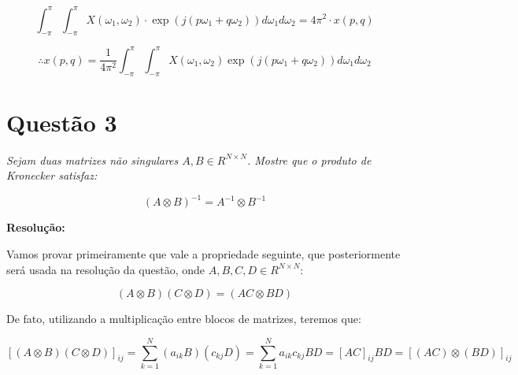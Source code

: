 \documentclass[]{abntex2}
\begin{document}
\begin{equation*}
	\int_{-\pi}^{\pi} \int_{-\pi}^{\pi}X(\omega_1, \omega_2) \cdot \exp \left( j (p \omega_1 + q \omega_2) \right)d\omega_1 d\omega_2 = 4\pi^{2}\cdot x(p,q)
\end{equation*}

\begin{tcolorbox}
	\[
		\therefore x(p, q) = \frac{1}{4\pi^2} \int_{-\pi}^{\pi} \int_{-\pi}^{\pi} X(\omega_1, \omega_2) \exp \left( j (p \omega_1 + q \omega_2) \right) d\omega_1 d\omega_2
	\]
	\end{tcolorbox}


\section*{\textbf{Questão 3}}

\textit{Sejam duas matrizes não singulares $A,B \in R^{N \times N}$. Mostre que o produto de Kronecker satisfaz:}

\begin{equation}
	{(A \otimes B)}^{-1} = A^{-1} \otimes B^{-1}
	\label{eq:inv}
\end{equation}

\textbf{Resolução:}

Vamos provar primeiramente que vale a propriedade seguinte, que posteriormente será usada na resolução da questão, onde $A,B,C,D \in R^{N \times N}$:

\begin{equation*}
	(A \otimes B)(C \otimes D) = (AC \otimes BD)
\end{equation*}

De fato, utilizando a multiplicação entre blocos de matrizes, teremos que:

\begin{equation*}
	{[(A \otimes B)(C \otimes D)]}_{ij} = \sum_{k=1}^{N} (a_{ik}B)(c_{kj}D) = \sum_{k=1}^{N} a_{ik}c_{kj}BD = {[AC]}_{ij} BD =  {[(AC) \otimes (BD)]}_{ij}
\end{equation*}
\end{document}
